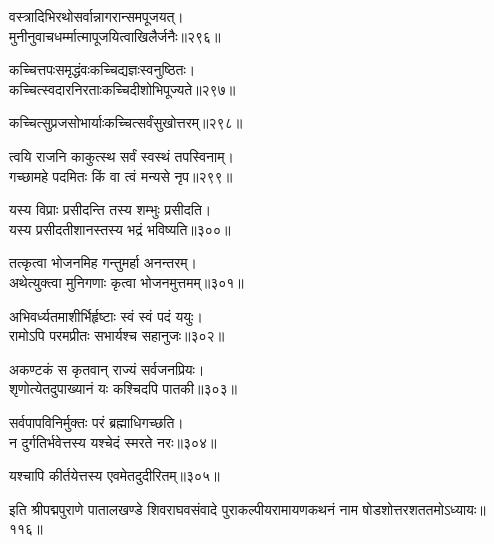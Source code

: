 \begin{flushleft}
वस्त्रादिभिरथोसर्वान्नागरान्समपूजयत्।\\
मुनीनुवाचधर्म्मात्मापूजयित्वाखिलैर्जनैः॥२९६॥

कच्चित्तपःसमृद्धंवःकच्चिद्यज्ञःस्वनुष्ठितः।\\
कच्चित्स्वदारनिरताःकच्चिदीशोभिपूज्यते॥२९७॥

कच्चित्सुप्रजसोभार्याःकच्चित्सर्वंसुखोत्तरम्॥२९८॥


त्वयि राजनि काकुत्स्थ सर्वं स्वस्थं तपस्विनाम्।\\
गच्छामहे पदमितः किं वा त्वं मन्यसे नृप॥२९९॥


यस्य विप्राः प्रसीदन्ति तस्य शम्भुः प्रसीदति।\\
यस्य प्रसीदतीशानस्तस्य भद्रं भविष्यति॥३००॥

तत्कृत्वा भोजनमिह गन्तुमर्हा अनन्तरम्।\\
अथेत्युक्त्वा मुनिगणाः कृत्वा भोजनमुत्तमम्॥३०१॥

अभिवर्ध्यतमाशीर्भिर्हृष्टाः स्वं स्वं पदं ययुः।\\
रामोऽपि परमप्रीतः सभार्यश्च सहानुजः॥३०२॥

अकण्टकं स कृतवान् राज्यं सर्वजनप्रियः।\\
शृणोत्येतदुपाख्यानं यः कश्चिदपि पातकी॥३०३॥

सर्वपापविनिर्मुक्तः परं ब्रह्माधिगच्छति।\\
न दुर्गतिर्भवेत्तस्य यश्चेदं स्मरते नरः॥३०४॥

यश्चापि कीर्तयेत्तस्य एवमेतदुदीरितम्॥३०५॥

\end{flushleft}

इति श्रीपद्मपुराणे पातालखण्डे शिवराघवसंवादे पुराकल्पीयरामायणकथनं नाम षोडशोत्तरशततमोऽध्यायः॥११६॥

